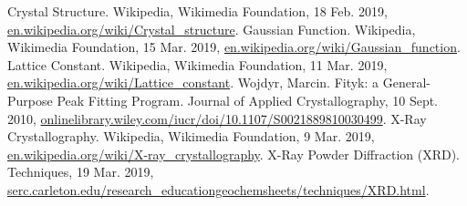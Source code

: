 \documentclass[twocolumn]{article}
\begin{document}
\newpage
\begin{thebibliography}{6}
Crystal Structure. Wikipedia, Wikimedia Foundation, 18 Feb. 2019, \url{en.wikipedia.org/wiki/Crystal_structure}.
Gaussian Function. Wikipedia, Wikimedia Foundation, 15 Mar. 2019, \url{en.wikipedia.org/wiki/Gaussian_function}.
Lattice Constant. Wikipedia, Wikimedia Foundation, 11 Mar. 2019, \url{en.wikipedia.org/wiki/Lattice_constant}.
Wojdyr, Marcin. Fityk: a General-Purpose Peak Fitting Program. Journal of Applied Crystallography, 10 Sept. 2010, \url{onlinelibrary.wiley.com/iucr/doi/10.1107/S0021889810030499}.
X-Ray Crystallography. Wikipedia, Wikimedia Foundation, 9 Mar. 2019, \url{en.wikipedia.org/wiki/X-ray_crystallography}.
X-Ray Powder Diffraction (XRD). Techniques, 19 Mar. 2019, \url{serc.carleton.edu/research_educationgeochemsheets/techniques/XRD.html}.
\end{thebibliography}
\end{document}
